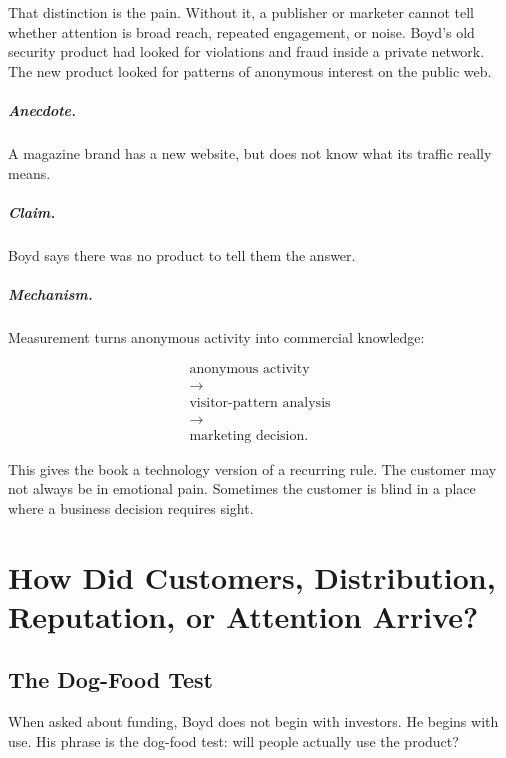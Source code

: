 \documentclass[11pt,oneside]{book}
\begin{document}
That distinction is the pain. Without it, a publisher or marketer cannot tell whether attention is broad reach, repeated engagement, or noise. Boyd's old security product had looked for violations and fraud inside a private network. The new product looked for patterns of anonymous interest on the public web.

\paragraph{Anecdote.}
A magazine brand has a new website, but does not know what its traffic really means.

\paragraph{Claim.}
Boyd says there was no product to tell them the answer.

\paragraph{Mechanism.}
Measurement turns anonymous activity into commercial knowledge:

\begin{equation}
\begin{gathered}
\text{anonymous activity}\\
\longrightarrow\\
\text{visitor-pattern analysis}\\
\longrightarrow\\
\text{marketing decision}.
\end{gathered}
\end{equation}

This gives the book a technology version of a recurring rule. The customer may not always be in emotional pain. Sometimes the customer is blind in a place where a business decision requires sight.

\chapter{How Did Customers, Distribution, Reputation, or Attention Arrive?}

\section{The Dog-Food Test}

When asked about funding, Boyd does not begin with investors. He begins with use. His phrase is the dog-food test: will people actually use the product?
\end{document}
